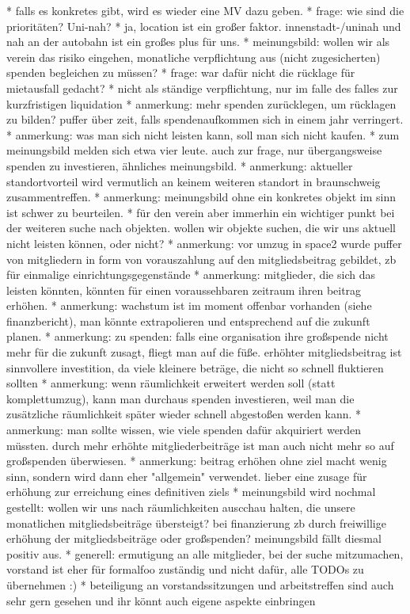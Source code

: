 \documentclass{s0minutes}
\begin{document}
		* falls es konkretes gibt, wird es wieder eine MV dazu geben.
		* frage: wie sind die prioritäten? Uni-nah? 
			* ja, location ist ein großer faktor. innenstadt-/uninah und nah an der autobahn ist ein großes plus für uns.
		* meinungsbild: wollen wir als verein das risiko eingehen, monatliche verpflichtung aus (nicht zugesicherten) spenden begleichen zu müssen?
			* frage: war dafür nicht die rücklage für mietausfall gedacht?
				* nicht als ständige verpflichtung, nur im falle des falles zur kurzfristigen liquidation
				* anmerkung: mehr spenden zurücklegen, um rücklagen zu bilden? puffer über zeit, falls spendenaufkommen sich in einem jahr verringert.
			* anmerkung: was man sich nicht leisten kann, soll man sich nicht kaufen.
			* zum meinungsbild melden sich etwa vier leute. auch zur frage, nur übergangsweise spenden zu investieren, ähnliches meinungsbild.
		* anmerkung: aktueller standortvorteil wird vermutlich an keinem weiteren standort in braunschweig zusammentreffen.
		* anmerkung: meinungsbild ohne ein konkretes objekt im sinn ist schwer zu beurteilen.
			* für den verein aber immerhin ein wichtiger punkt bei der weiteren suche nach objekten. wollen wir objekte suchen, die wir uns aktuell nicht leisten können, oder nicht?
		* anmerkung: vor umzug in space2 wurde puffer von mitgliedern in form von vorauszahlung auf den mitgliedsbeitrag gebildet, zb für einmalige einrichtungsgegenstände
		* anmerkung: mitglieder, die sich das leisten könnten, könnten für einen voraussehbaren zeitraum ihren beitrag erhöhen.
		* anmerkung: wachstum ist im moment offenbar vorhanden (siehe finanzbericht), man könnte extrapolieren und entsprechend auf die zukunft planen.
		* anmerkung: zu spenden: falls eine organisation ihre großspende nicht mehr für die zukunft zusagt, fliegt man auf die füße. erhöhter mitgliedsbeitrag ist sinnvollere investition, da viele kleinere beträge, die nicht so schnell fluktieren sollten
		* anmerkung: wenn räumlichkeit erweitert werden soll (statt komplettumzug), kann man durchaus spenden investieren, weil man die zusätzliche räumlichkeit später wieder schnell abgestoßen werden kann.
		* anmerkung: man sollte wissen, wie viele spenden dafür akquiriert werden müssten. durch mehr erhöhte mitgliederbeiträge ist man auch nicht mehr so auf großspenden überwiesen.
		* anmerkung: beitrag erhöhen ohne ziel macht wenig sinn, sondern wird dann eher "allgemein" verwendet. lieber eine zusage für erhöhung zur erreichung eines definitiven ziels
		* meinungsbild wird nochmal gestellt: wollen wir uns nach räumlichkeiten auscchau halten, die unsere monatlichen mitgliedsbeiträge übersteigt? bei finanzierung zb durch freiwillige erhöhung der mitgliedsbeiträge oder großspenden? meinungsbild fällt diesmal positiv aus.
		* generell: ermutigung an alle mitglieder, bei der suche mitzumachen, vorstand ist eher für formalfoo zuständig und nicht dafür, alle TODOs zu übernehmen :)
			* beteiligung an vorstandssitzungen und arbeitstreffen sind auch sehr gern gesehen und ihr könnt auch eigene aspekte einbringen
\end{document}
